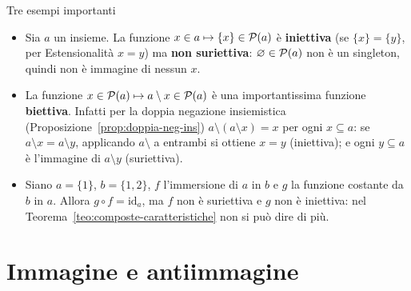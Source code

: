 \begin{esempio}{Tre esempi importanti}
    \begin{itemize}
        \item Sia $a$ un insieme. La funzione $x \in a \mapsto \{x\} \in \mathcal{P}(a)$ è \textbf{iniettiva} (se $\{x\} = \{y\}$, per
              Estensionalità $x = y$) ma \textbf{non suriettiva}: $\varnothing \in \mathcal{P}(a)$ non è un singleton, quindi non è immagine di nessun $x$.
        \item La funzione $x \in \mathcal{P}(a) \mapsto a \setminus x \in \mathcal{P}(a)$ è una importantissima funzione \textbf{biettiva}.
              Infatti per la doppia negazione insiemistica (Proposizione~\ref{prop:doppia-neg-ins}) $a \setminus (a \setminus x) = x$
              per ogni $x \subseteq a$: se $a \setminus x = a \setminus y$, applicando $a \setminus$ a entrambi si ottiene $x = y$
              (iniettiva); e ogni $y \subseteq a$ è l'immagine di $a \setminus y$ (suriettiva).
        \item Siano $a = \{1\}$, $b = \{1, 2\}$, $f$ l'immersione di $a$ in $b$ e $g$ la funzione costante da $b$ in $a$.
              Allora $g \circ f = \mathrm{id}_a$, ma $f$ non è suriettiva e $g$ non è iniettiva: nel Teorema~\ref{teo:composte-caratteristiche}
              non si può dire di più.
    \end{itemize}
    \begin{center}
    \end{center}
\end{esempio}

\section{Immagine e antiimmagine}\label{sec:immagine}


